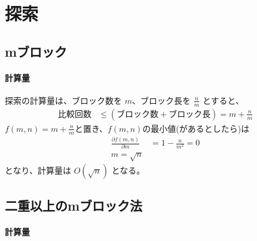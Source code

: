 \documentclass{ltjsarticle}
\begin{document}

\section{探索}
\subsection{mブロック}
\paragraph{計算量}
探索の計算量は、ブロック数を $m$、ブロック長を $\frac{n}{m}$ とすると、
\begin{align}
    \text{比較回数} &\leq (\text{ブロック数} + \text{ブロック長}) = m + \frac{n}{m}
\end{align}
    $f(m, n) = m + \frac{n}{m}$と置き、$f(m, n)$の最小値(があるとしたら)は\\
\begin{align}
    \frac{\partial f(m, n)}{\partial m} &= 1 - \frac{n}{m^2} = 0 \\
    m = \sqrt{n}
\end{align}
となり、計算量は $O(\sqrt{n})$ となる。

\subsection{二重以上のmブロック法}


\paragraph{計算量}



\end{document}
